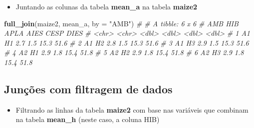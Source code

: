 \documentclass[
]{book}
\newenvironment{Shaded}{\begin{snugshade}}{\end{snugshade}}
\newcommand{\CommentTok}[1]{\textcolor[rgb]{0.56,0.35,0.01}{\textit{#1}}}
\newcommand{\DataTypeTok}[1]{\textcolor[rgb]{0.13,0.29,0.53}{#1}}
\newcommand{\KeywordTok}[1]{\textcolor[rgb]{0.13,0.29,0.53}{\textbf{#1}}}
\newcommand{\NormalTok}[1]{#1}
\newcommand{\OperatorTok}[1]{\textcolor[rgb]{0.81,0.36,0.00}{\textbf{#1}}}
\newcommand{\StringTok}[1]{\textcolor[rgb]{0.31,0.60,0.02}{#1}}
\providecommand{\tightlist}{%
  \setlength{\itemsep}{0pt}\setlength{\parskip}{0pt}}
\begin{document}

\begin{Shaded}
\end{Shaded}

\begin{itemize}
\tightlist
\item
  Juntando as colunas da tabela \textbf{mean\_a} na tabela \textbf{maize2}
\end{itemize}


\begin{Shaded}
\begin{Highlighting}[]
\KeywordTok{full_join}\NormalTok{(maize2, mean_a, }\DataTypeTok{by =} \StringTok{"AMB"}\NormalTok{)}
\CommentTok{# # A tibble: 6 x 6}
\CommentTok{#   AMB   HIB    APLA  AIES  CESP  DIES}
\CommentTok{#   <chr> <chr> <dbl> <dbl> <dbl> <dbl>}
\CommentTok{# 1 A1    H1      2.7   1.5  15.3  51.6}
\CommentTok{# 2 A1    H2      2.8   1.5  15.3  51.6}
\CommentTok{# 3 A1    H3      2.9   1.5  15.3  51.6}
\CommentTok{# 4 A2    H1      2.9   1.8  15.4  51.8}
\CommentTok{# 5 A2    H2      2.9   1.8  15.4  51.8}
\CommentTok{# 6 A2    H3      2.9   1.8  15.4  51.8}
\end{Highlighting}
\end{Shaded}

\hypertarget{junuxe7uxf5es-com-filtragem-de-dados}{%
\subsection{Junções com filtragem de dados}\label{junuxe7uxf5es-com-filtragem-de-dados}}

\begin{itemize}
\tightlist
\item
  Filtrando as linhas da tabela \textbf{maize2} com base nas variáveis que combinam na tabela \textbf{mean\_h} (neste caso, a coluna HIB) 
\end{itemize}
\end{document}
